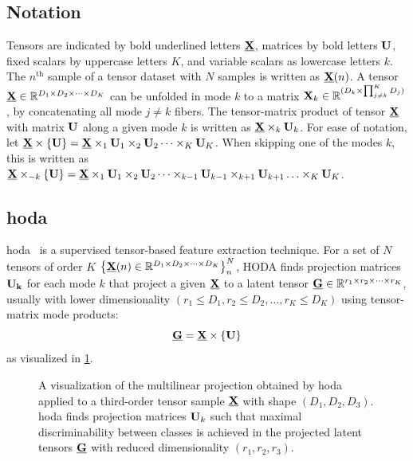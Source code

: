 \subsection{Notation}
Tensors are indicated by bold underlined letters $\ten{X}$, matrices by bold
letters $\mat{U}$, fixed scalars by uppercase letters $K$, and variable
scalars as lowercase letters $k$.
The $n^\text{th}$ sample of a tensor dataset with $N$ samples is written as
$\ten{X}(n)$.
A tensor $\ten{X}\in \mathbb{R}^{D_1\times D_2 \times \cdots \times D_K}$ can be
unfolded in mode $k$ to a matrix
$\mat{X}_k\in\mathbb{R}^{(D_k\times\prod_{j\neq k}^K D_j)}$, by concatenating
all mode $j\neq k$ fibers.
The tensor-matrix product of tensor $\ten{X}$ with matrix $\mat{U}$ along a
given mode $k$ is written as $\ten{X}\mpr{\mat{U}}{k}$. For ease of notation, let
$\ten{X}\mmpr{\mat{U}} =
	\ten{X}\mpr{\mat{U}}{1}\mpr{\mat{U}}{2}\cdots\mpr{\mat{U}}{K}$.
When skipping one of the modes $k$, this is
written as $\ten{X}\mmprs{\mat{U}}{k} =
	\ten{X}\mpr{\mat{U}}{1}\mpr{\mat{U}}{2}\cdots\mpr{\mat{U}}{k-1}\mpr{\mat{U}}{k+1}\ldots\mpr{\mat{U}}{K}$.

\subsection{\Acl{hoda}}
\Acl{hoda}~\cite{Phan2010} is a
supervised tensor-based feature extraction technique.
For a set of $N$ tensors of order $K$
$\left\{\ten{X}(n)\in\mathbb{R}^{D_1\times D_2 \times \cdots \times
		D_K}\right\}_n^N$, HODA finds projection matrices $\mat{U_k}$ for each mode $k$
that project a given $\ten{X}$ to a latent tensor
$\ten{G}\in\mathbb{R}^{r_1\times r_2\times\cdots\times r_K}$, usually with lower
dimensionality $(r_1\leq D_1,r_2\leq D_2,\ldots,r_K\leq D_K)$ using
tensor-matrix mode products:
\begin{equation}
	\ten{G}  = \ten{X}\mmpr{\mat{U}}
	\label{eq:HODA-backward}
\end{equation}
as visualized in \cref{fig:HODA-backward}.
\begin{figure}[t]
	
  \caption[A \acs{hoda} backward projection.]{%
    A visualization of the multilinear projection obtained by \acf{hoda} applied to a third-order tensor
    sample $\ten{X}$ with shape $(D_1,D_2, D_3)$.
		\Ac{hoda} finds projection matrices $\mat{U}_k$ such that maximal
		discriminability between classes is achieved in the projected latent tensors
		$\ten{G}$ with reduced dimensionality $(r_1,r_2,r_3)$.}
	\label{fig:HODA-backward}
\end{figure}

